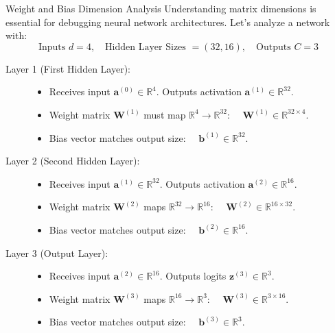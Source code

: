 \documentclass[9pt]{beamer}
\begin{document}
\begin{frame}{Weight and Bias Dimension Analysis}
  Understanding matrix dimensions is essential for debugging neural network architectures. Let's analyze a network with:
  $$\text{Inputs } d=4, \quad \text{Hidden Layer Sizes } = (32, 16), \quad \text{Outputs } C=3$$
  \begin{description}
    \item[Layer 1 (First Hidden Layer):]
      \begin{itemize}
        \item Receives input $\mathbf{a}^{(0)} \in \mathbb{R}^4$. Outputs activation $\mathbf{a}^{(1)} \in \mathbb{R}^{32}$.
        \item Weight matrix $\mathbf{W}^{(1)}$ must map $\mathbb{R}^4 \to \mathbb{R}^{32}$: $\quad \mathbf{W}^{(1)} \in \mathbb{R}^{32 \times 4}$.
        \item Bias vector matches output size: $\quad \mathbf{b}^{(1)} \in \mathbb{R}^{32}$.
      \end{itemize}
    \item[Layer 2 (Second Hidden Layer):]
      \begin{itemize}
        \item Receives input $\mathbf{a}^{(1)} \in \mathbb{R}^{32}$. Outputs activation $\mathbf{a}^{(2)} \in \mathbb{R}^{16}$.
        \item Weight matrix $\mathbf{W}^{(2)}$ maps $\mathbb{R}^{32} \to \mathbb{R}^{16}$: $\quad \mathbf{W}^{(2)} \in \mathbb{R}^{16 \times 32}$.
        \item Bias vector matches output size: $\quad \mathbf{b}^{(2)} \in \mathbb{R}^{16}$.
      \end{itemize}
    \item[Layer 3 (Output Layer):]
      \begin{itemize}
        \item Receives input $\mathbf{a}^{(2)} \in \mathbb{R}^{16}$. Outputs logits $\mathbf{z}^{(3)} \in \mathbb{R}^3$.
        \item Weight matrix $\mathbf{W}^{(3)}$ maps $\mathbb{R}^{16} \to \mathbb{R}^3$: $\quad \mathbf{W}^{(3)} \in \mathbb{R}^{3 \times 16}$.
        \item Bias vector matches output size: $\quad \mathbf{b}^{(3)} \in \mathbb{R}^3$.
      \end{itemize}
  \end{description}
\end{frame}
\end{document}
